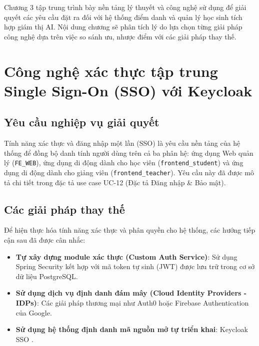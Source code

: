 \documentclass[../DoAn.tex]{subfiles}
\begin{document}
Chương 3 tập trung trình bày nền tảng lý thuyết và công nghệ sử dụng để giải quyết các yêu cầu đặt ra đối với hệ thống điểm danh và quản lý học sinh tích hợp giám thị AI. Nội dung chương sẽ phân tích lý do lựa chọn từng giải pháp công nghệ dựa trên việc so sánh ưu, nhược điểm với các giải pháp thay thế.

\section{Công nghệ xác thực tập trung Single Sign-On (SSO) với Keycloak}
\label{section:3.1}

\subsection{Yêu cầu nghiệp vụ giải quyết}
Tính năng xác thực và đăng nhập một lần (SSO) là yêu cầu nền tảng của hệ thống để đồng bộ danh tính người dùng trên cả ba phân hệ: ứng dụng Web quản lý (\mbox{\texttt{FE\_WEB}}), ứng dụng di động dành cho học viên (\mbox{\texttt{frontend\_student}}) và ứng dụng di động dành cho giảng viên (\mbox{\texttt{frontend\_teacher}}). Yêu cầu này đã được mô tả chi tiết trong đặc tả use case UC-12 (Đặc tả Đăng nhập \& Bảo mật).

\subsection{Các giải pháp thay thế}
Để hiện thực hóa tính năng xác thực và phân quyền cho hệ thống, các hướng tiếp cận sau đã được cân nhắc:
\begin{itemize}
    \item \textbf{Tự xây dựng module xác thực (Custom Auth Service)}: Sử dụng Spring Security kết hợp với mã token tự sinh (JWT) được lưu trữ trong cơ sở dữ liệu PostgreSQL.
    \item \textbf{Sử dụng dịch vụ định danh đám mây (Cloud Identity Providers - IDPs)}: Các giải pháp thương mại như Auth0 hoặc Firebase Authentication của Google.
    \item \textbf{Sử dụng hệ thống định danh mã nguồn mở tự triển khai}: Keycloak SSO \cite{keycloak2026}.
\end{itemize}
\end{document}
